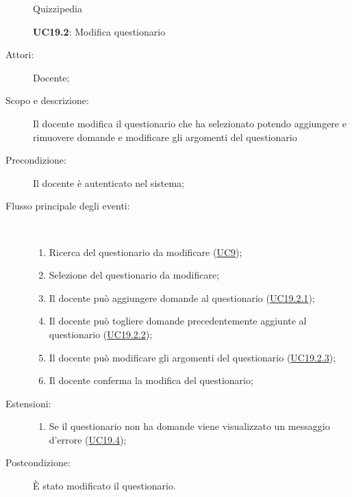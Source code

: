 	\begin{figure}[H]
		\centering
		\begin{resizedtikzpicture}{\textwidth}
		\begin{umlsystem}[x=0, fill=lightgray!20]{Quizzipedia}
		\end{umlsystem}
		\end{resizedtikzpicture}
		\caption{\textbf{UC19.2}: Modifica questionario}
		\label{UC19.2}
	\end{figure}
\begin{description}
\item[Attori:] Docente;
\item[Scopo e descrizione:] Il docente modifica il questionario che ha selezionato potendo aggiungere e rimuovere domande e modificare gli argomenti del questionario
      \item[Precondizione:] Il docente è autenticato nel sistema;

        \item[Flusso principale degli eventi:] \ 
 \begin{enumerate}
          \item Ricerca del questionario da modificare (\hyperlink{UC9}{UC9});
          \item Selezione del questionario da modificare;
          \item Il docente può aggiungere domande al questionario (\hyperlink{UC19.2.1}{UC19.2.1});
          \item Il docente può togliere domande precedentemente aggiunte al questionario (\hyperlink{UC19.2.2}{UC19.2.2});
          \item Il docente può modificare gli argomenti del questionario (\hyperlink{UC19.2.3}{UC19.2.3});
          \item Il docente conferma la modifica del questionario;

      \end{enumerate}
    \item[Estensioni:]
      \begin{enumerate}
          \item Se il questionario non ha domande viene visualizzato un messaggio d'errore (\hyperlink{UC19.4}{UC19.4});

      \end{enumerate}
    \item[Postcondizione:] È stato modificato il questionario.
  \end{description}
\hypertarget{UC19.2.1}{}
